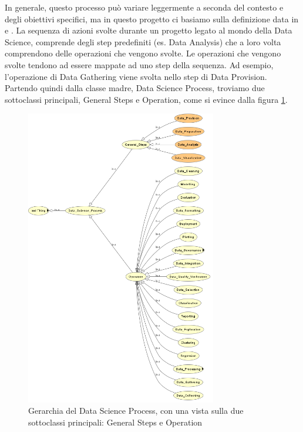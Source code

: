 In generale, questo processo può variare leggermente a seconda del contesto e degli obiettivi specifici, ma in questo progetto ci basiamo sulla definizione data in \cite{naous2017analytics} e \cite{BDOnto}. La sequenza di azioni svolte durante un progetto legato al mondo della Data Science, comprende degli step predefiniti (es. Data Analysis) che a loro volta comprendono delle operazioni che vengono svolte. Le operazioni che vengono svolte tendono ad essere mappate ad uno step della sequenza. Ad esempio, l'operazione di Data Gathering viene svolta nello step di Data Provision. Partendo quindi dalla classe madre, Data Science Process, troviamo due sottoclassi principali, General Steps e Operation, come si evince dalla figura \ref{fig:dataproc}.
\begin{figure}[H]
    \centering
    \includegraphics[height=13cm]{docs/images/dataprocowlviz.png}
    \caption{Gerarchia del Data Science Process, con una vista sulla due sottoclassi principali: General Steps e Operation}
    \label{fig:dataproc}
\end{figure}
